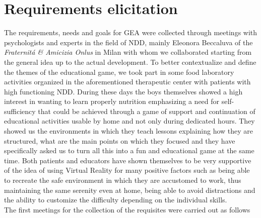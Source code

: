 \section{Requirements elicitation}
The requirements, needs and goals for GEA were collected through meetings with psychologists and experts in the field of NDD, mainly Eleonora Beccaluva of the \textit{Fraternit\'a \& Amicizia Onlus} in Milan with whom we collaborated starting from the general idea up to the actual development. To better contextualize and define the themes of the educational game, we took part in some food laboratory activities organized in the aforementioned therapeutic center with patients with high functioning NDD. During these days the boys themselves showed a high interest in wanting to learn properly nutrition emphasizing a need for self-sufficiency that could be achieved through a game of support and continuation of educational activities usable by home and not only during dedicated hours. They showed us the environments in which they teach lessons explaining how they are structured, what are the main points on which they focused and they have specifically asked us to turn all this into a fun and educational game at the same time. Both patients and educators have shown themselves to be very supportive of the idea of using Virtual Reality for many positive factors such as being able to recreate the safe environment in which they are accustomed to work, thus maintaining the same serenity even at home, being able to avoid distractions and the ability to customize the difficulty depending on the individual skills.\\
The first meetings for the collection of the requisites were carried out as follows
